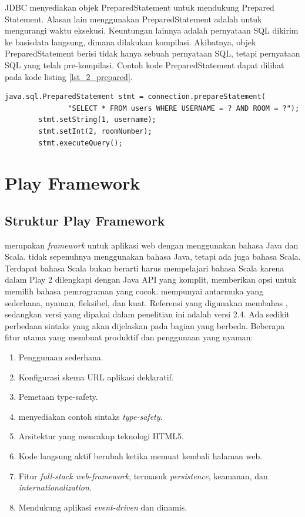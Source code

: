 JDBC menyediakan objek PreparedStatement untuk mendukung Prepared Statement. Alasan lain menggunakan PreparedStatement adalah untuk mengurangi waktu eksekusi. Keuntungan lainnya adalah pernyataan SQL dikirim ke basisdata langsung, dimana dilakukan kompilasi. Akibatnya, objek PreparedStatement berisi tidak hanya sebuah pernyataan SQL, tetapi pernyataan SQL yang telah pre-kompilasi. Contoh kode PreparedStatement dapat dilihat pada kode listing \ref{lst_2_prepared}.

\begin{lstlisting}[caption=Contoh PreparedStatement,label = {lst_2_prepared}]
		java.sql.PreparedStatement stmt = connection.prepareStatement(
               "SELECT * FROM users WHERE USERNAME = ? AND ROOM = ?");
		stmt.setString(1, username);
		stmt.setInt(2, roomNumber);
		stmt.executeQuery();
\end{lstlisting}

\section{Play Framework}
\label{sec:play}
\subsection{Struktur Play Framework}
\play \cite{playforjava} merupakan \textit{framework} untuk aplikasi web dengan menggunakan bahasa Java dan Scala. \play tidak sepenuhnya menggunakan bahasa Java, tetapi ada juga bahasa Scala. Terdapat bahasa Scala bukan berarti harus mempelajari bahasa Scala karena dalam Play 2 dilengkapi dengan Java API yang komplit, memberikan opsi untuk memilih bahasa pemrograman yang cocok. \play mempunyai antarmuka yang sederhana, nyaman, fleksibel, dan kuat. Referensi yang digunakan membahas , sedangkan versi \play yang dipakai dalam penelitian ini adalah versi 2.4. Ada sedikit perbedaan sintaks yang akan dijelaskan pada bagian yang berbeda.
Beberapa fitur utama yang membuat \play produktif dan penggunaan yang nyaman:

\begin{enumerate}
	\item Penggunaan \play sederhana.
	\item Konfigurasi skema URL aplikasi deklaratif.
	\item Pemetaan type-safety.
	\item \play menyediakan contoh sintaks \textit{type-safety}.
	\item Arsitektur yang mencakup teknologi HTML5.
	\item Kode langsung aktif berubah ketika memuat kembali halaman web.
	\item Fitur \textit{full-stack web-framework}, termasuk \textit{persistence}, keamanan, dan \textit{internationalization}.
	\item Mendukung aplikasi \textit{event-driven} dan dinamis.
\end{enumerate}

